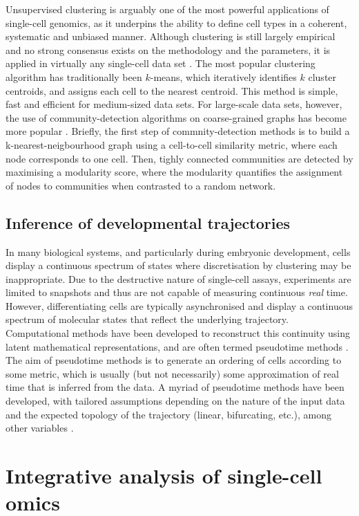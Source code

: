 Unsupervised clustering is arguably one of the most powerful applications of single-cell genomics, as it underpins the ability to define cell types in a coherent, systematic and unbiased manner. Although clustering is still largely empirical and no strong consensus exists on the methodology and the parameters, it is applied in virtually any single-cell data set \cite{Kiselev2019}. The most popular clustering algorithm has traditionally been $k$-means, which iteratively identifies $k$ cluster centroids, and assigns each cell to the nearest centroid. This method is simple, fast and efficient for medium-sized data sets. For large-scale data sets, however, the use of community-detection algorithms on coarse-grained graphs has become more popular \cite{Luecken2019}. Briefly, the first step of commnity-detection methods is to build a k-nearest-neigbourhood graph using a cell-to-cell similarity metric, where each node corresponds to one cell. Then, tighly connected communities are detected by maximising a modularity score, where the modularity quantifies the assignment of nodes to communities when contrasted to a random network.

\subsection{Inference of developmental trajectories}

In many biological systems, and particularly during embryonic development, cells display a continuous spectrum of states where discretisation by clustering may be inappropriate. Due to the destructive nature of single-cell assays, experiments are limited to snapshots and thus are not capable of measuring continuous \textit{real} time. However, differentiating cells are typically asynchronised and display a continuous spectrum of molecular states that reflect the underlying trajectory. Computational methods have been developed to reconstruct this continuity using latent mathematical representations, and are often termed pseudotime methods \cite{Saelens2019}. The aim of pseudotime methods is to generate an ordering of cells according to some metric, which is usually (but not necessarily) some approximation of real time that is inferred from the data. A myriad of pseudotime methods have been developed, with tailored assumptions depending on the nature of the input data and the expected topology of the trajectory (linear, bifurcating, etc.), among other variables \cite{Saelens2019}. 

\section{Integrative analysis of single-cell omics}

